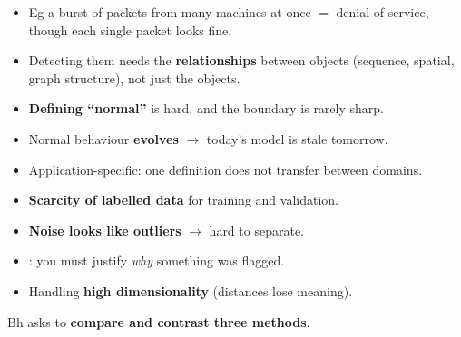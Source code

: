 {\begin{itemize}
\begin{itemize}
    \item Eg a burst of packets from many machines at once $=$ denial-of-service, though each
          single packet looks fine.
    \item Detecting them needs the \textbf{relationships} between objects (sequence, spatial,
          graph structure), not just the objects.
  \end{itemize}
\end{itemize}
\begin{itemize}
  \item \textbf{Defining ``normal''} is hard, and the boundary is rarely sharp.
  \item Normal behaviour \textbf{evolves} $\rightarrow$ today's model is stale tomorrow.
  \item Application-specific: one definition does not transfer between domains.
  \item \textbf{Scarcity of labelled data} for training and validation.
  \item \textbf{Noise looks like outliers} $\rightarrow$ hard to separate.
  \item {}: you must justify \emph{why} something was flagged.
  \item Handling \textbf{high dimensionality} (distances lose meaning).
\end{itemize}}

\hr


{\color{sub}\footnotesize {}  Bh asks to \textbf{compare and contrast three methods}.}

